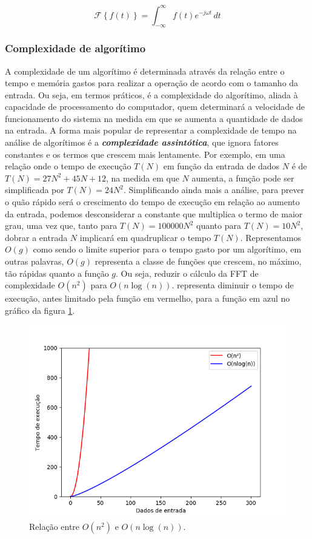 \begin{equation} \label{eq:DTFT}
	\mathcal{F} 	\left \{ f(t) \right \}  = \int_{-\infty}^{\infty} f(t) e^{-j \omega t}\,dt
\end{equation}

\subsubsection{Complexidade de algorítimo}

A complexidade de um algorítimo é determinada através da relação entre o tempo e memória gastos para realizar a operação de acordo com o tamanho da entrada. Ou seja, em termos práticos, é a complexidade do algorítimo, aliada à capacidade de processamento do computador, quem determinará a velocidade de funcionamento do sistema na medida em que se aumenta a quantidade de dados na entrada. A forma mais popular de representar a complexidade de tempo na análise de algorítimos é a \textbf{\textit{complexidade assintótica}}, que ignora fatores constantes e os termos que crescem mais lentamente. Por exemplo, em uma relação onde o tempo de execução $T(N)$ em função da entrada de dados $N$ é de $T(N) = 27N^2 + 45N + 12$, na medida em que $N$ aumenta, a função pode ser simplificada por $T(N) = 24N^2$. Simplificando ainda mais a análise, para prever o quão rápido será o crescimento do tempo de execução em relação ao aumento da entrada, podemos desconsiderar a constante que multiplica o termo de maior grau, uma vez que, tanto para $T(N) = 100000N^2$ quanto para $T(N) = 10N^2$, dobrar a entrada $N$ implicará em quadruplicar o tempo $T(N)$. Representamos $O(g)$ como sendo o limite superior para o tempo gasto por um algorítimo, em outras palavras, $O(g)$ representa a classe de funções que crescem, no máximo, tão rápidas quanto a função $g$. Ou seja, reduzir o cálculo da FFT de complexidade \boldmath $O(n^2)$ para $O(n \log (n)) $.   \unboldmath representa diminuir o tempo de execução, antes limitado pela função em vermelho, para a função em azul no gráfico da figura \ref{fig:grafico_complexidade}.

\begin{figure}[h!]
	\begin{center}
		\includegraphics[width=0.7\linewidth]{images/Complexidade_algoritmo.png}
		\caption{Relação entre \boldmath $O(n^2)$ e $O(n \log (n)) $.   \unboldmath}
		\label{fig:grafico_complexidade}
	\end{center}
\end{figure}

